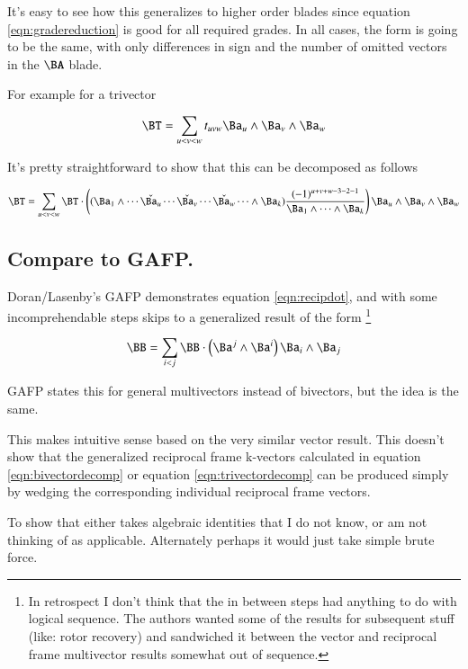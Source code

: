 \documentclass{article}      %
\begin{document}
It's easy to see how this generalizes to higher order blades since 
equation \ref{eqn:gradereduction} is good for all required grades.  In all cases, the form is going to be the same, with only differences
in sign and the number of omitted vectors in the $\BA$ blade.

For example for a trivector

\[
\BT = \sum_{u<v<w}t_{uvw} \Ba_u \wedge \Ba_v \wedge \Ba_w
\]

It's pretty straightforward to show that this can be decomposed as follows

\begin{equation}\label{eqn:trivectordecomp}
\BT = \sum_{u<v<w} \BT \cdot
\left(
(\Ba_1 \wedge \cdots \check{\Ba_u} \cdots \check{\Ba_v} \cdots \check{\Ba_w} \cdots \wedge \Ba_k)
\frac{(-1)^{u+v+w-3-2-1}}
{\Ba_1 \wedge \cdots \wedge \Ba_k}
\right)
\Ba_u \wedge \Ba_v \wedge \Ba_w
\end{equation}

\subsection{ Compare to GAFP. }

Doran/Lasenby's GAFP 
demonstrates equation \ref{eqn:recipdot}, and with some incomprehendable steps skips to a generalized
result of the form
\footnote{ In retrospect I don't think that the in between steps had anything to do with logical sequence.  The authors wanted some of the results for subsequent stuff (like: rotor recovery) and sandwiched it between the vector and reciprocal frame multivector results somewhat out of sequence.}

\begin{equation}\label{eqn:bivectordecompwithrecipbivector}
\BB = \sum_{i<j} \BB \cdot \left(\Ba^j \wedge \Ba^i\right) \Ba_i \wedge \Ba_j
\end{equation}

GAFP states this for general multivectors instead of bivectors, but the idea is the same.

This makes intuitive sense based on the very similar vector result.  This doesn't show that
the generalized reciprocal frame k-vectors calculated in 
equation \ref{eqn:bivectordecomp} or equation \ref{eqn:trivectordecomp} can be produced simply
by wedging the corresponding individual reciprocal frame vectors.

To show that either takes algebraic identities that I do not know, or am not thinking of as applicable.
Alternately perhaps it would just take simple brute force.
\end{document}
